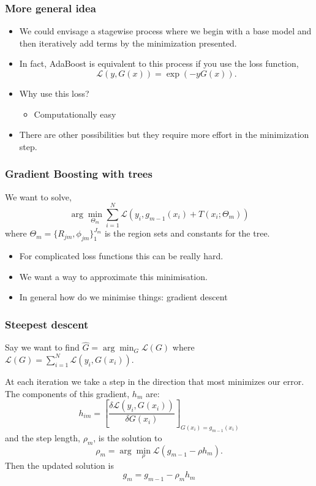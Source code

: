 \documentclass{beamer}
\begin{document}
\begin{frame}
	\frametitle{More general idea}
	\begin{itemize}
		\item We could envisage a stagewise process where we begin with a base model and then iteratively add terms by the minimization presented.
		\item In fact, AdaBoost is equivalent to this process if you use the loss function,
		\[
		\mathcal{L}(y, G(x)) = \exp(-y G(x)).
		\] 
		\item Why use this loss?
			\begin{itemize}
				\item Computationally easy
			\end{itemize}
		\item There are other possibilities but they require more effort in the minimization step.
	\end{itemize}
\end{frame}

\begin{frame}
	\frametitle{Gradient Boosting with trees}
	We want to solve,
		\[
		\arg \min_{\Theta_m}\sum_{i=1}^N\mathcal{L}(y_i, g_{m-1}(x_i) + T(x_i; \Theta_m))
		\]
		where $\Theta_m = \{R_{jm}, \phi_{jm}\}_1^{J_m}$ is the region sets and constants for the tree.
	
	\begin{itemize}
		\item For complicated loss functions this can be really hard.
		\item We want a way to approximate this minimisation.
		\item In general how do we minimise things: 
			gradient descent
	\end{itemize}
	
\end{frame}

\begin{frame}
	\frametitle{Steepest descent}
	Say we want to find $\hat{G} = \arg \min_G \mathcal{L}(G)$ where $\mathcal{L}(G) = \sum_{i=1}^N \mathcal{L}(y_i, G(x_i))$.

 At each iteration we take a step in the direction that most minimizes our error. The components of this gradient, $h_m$ are:
	\[
	h_{im} = \left[ \frac{\delta \mathcal{L}(y_i, G(x_i))}{\delta G(x_i)}\right]_{G(x_i) = g_{m-1}(x_i)}
	\]
 and the step length, $\rho_m$, is the solution to
	\[
	 \rho_m = \arg \min_\rho \mathcal{L}(g_{m-1} - \rho h_m).
	\]	
Then the updated solution is
\[
g_m = g_{m-1} - \rho_m h_m
\]	

\end{frame}
\end{document}
